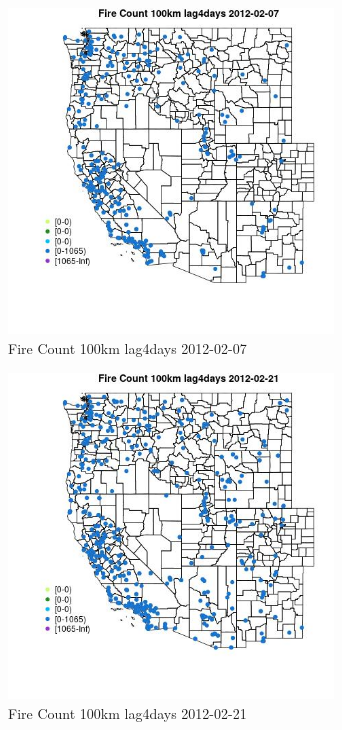 \begin{figure} 
\centering  
\includegraphics[width=0.77\textwidth]{Code_Outputs/Report_ML_input_PM25_Step4_part_f_de_duplicated_aves_prioritize_24hr_obswNAs_MapObsFire_Count_100km_lag4days2012-02-07.jpg} 
\caption{\label{fig:Report_ML_input_PM25_Step4_part_f_de_duplicated_aves_prioritize_24hr_obswNAsMapObsFire_Count_100km_lag4days2012-02-07}Fire Count 100km lag4days 2012-02-07} 
\end{figure} 
 

\begin{figure} 
\centering  
\includegraphics[width=0.77\textwidth]{Code_Outputs/Report_ML_input_PM25_Step4_part_f_de_duplicated_aves_prioritize_24hr_obswNAs_MapObsFire_Count_100km_lag4days2012-02-21.jpg} 
\caption{\label{fig:Report_ML_input_PM25_Step4_part_f_de_duplicated_aves_prioritize_24hr_obswNAsMapObsFire_Count_100km_lag4days2012-02-21}Fire Count 100km lag4days 2012-02-21} 
\end{figure} 
 

